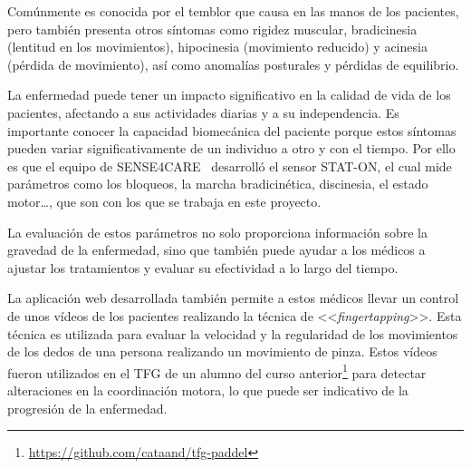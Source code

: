 Comúnmente es conocida por el temblor que causa en las manos de los pacientes, pero también presenta otros síntomas como rigidez muscular, bradicinesia (lentitud en los movimientos), hipocinesia (movimiento reducido) y acinesia (pérdida de movimiento), así como anomalías posturales y pérdidas de equilibrio.

La enfermedad puede tener un impacto significativo en la calidad de vida de los pacientes, afectando a sus actividades diarias y a su independencia. Es importante conocer la capacidad biomecánica del paciente porque estos síntomas pueden variar significativamente de un individuo a otro y con el tiempo. Por ello es que el equipo de SENSE4CARE~\cite{sense4care} desarrolló el sensor STAT-ON, el cual mide parámetros como los bloqueos, la marcha bradicinética, discinesia, el estado motor\ldots, que son con los que se trabaja en este proyecto.

La evaluación de estos parámetros no solo proporciona información sobre la gravedad de la enfermedad, sino que también puede ayudar a los médicos a ajustar los tratamientos y evaluar su efectividad a lo largo del tiempo.

La aplicación web desarrollada también permite a estos médicos llevar un control de unos vídeos de los pacientes realizando la técnica de <<\textit{fingertapping}>>. Esta técnica es utilizada para evaluar la velocidad y la regularidad de los movimientos de los dedos de una persona realizando un movimiento de pinza. Estos vídeos fueron utilizados en el TFG de un alumno del curso anterior\footnote{\url{https://github.com/cataand/tfg-paddel}} para detectar alteraciones en la coordinación motora, lo que puede ser indicativo de la progresión de la enfermedad.

